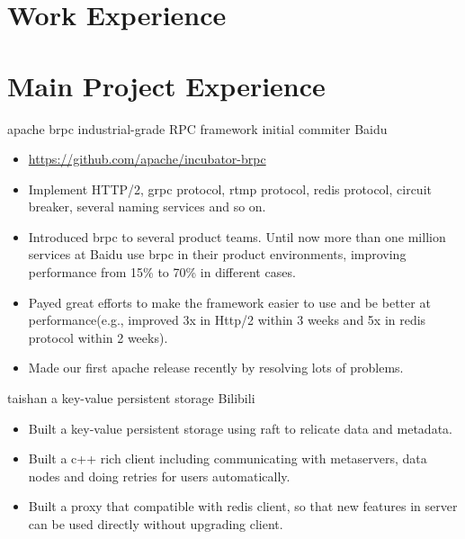 \documentclass[11pt,a4paper]{moderncv}
\begin{document}
\section{Work Experience}

\section{Main Project Experience}


{apache brpc}
{industrial-grade RPC framework}
{initial commiter}
{Baidu}
{
\begin{itemize}
    \item \url{https://github.com/apache/incubator-brpc}
    \item Implement HTTP/2, grpc protocol, rtmp protocol, redis protocol, circuit breaker, several naming services and so on.
    \item Introduced brpc to several product teams. Until now more than one million services at Baidu use brpc in their product environments, improving performance from 15\% to 70\% in different cases.
    \item Payed great efforts to make the framework easier to use and be better at performance(e.g., improved 3x in Http/2 within 3 weeks and 5x in redis protocol within 2 weeks).
    \item Made our first apache release recently by resolving lots of problems.
\end{itemize}
}

{taishan}
{a key-value persistent storage}
{Bilibili}
{}
{
\begin{itemize}
    \item Built a key-value persistent storage using raft to relicate data and metadata.
    \item Built a c++ rich client including communicating with metaservers, data nodes and doing retries for users automatically.
    \item Built a proxy that compatible with redis client, so that new features in server can be used directly without upgrading client.
\end{itemize}
}
\end{document}
